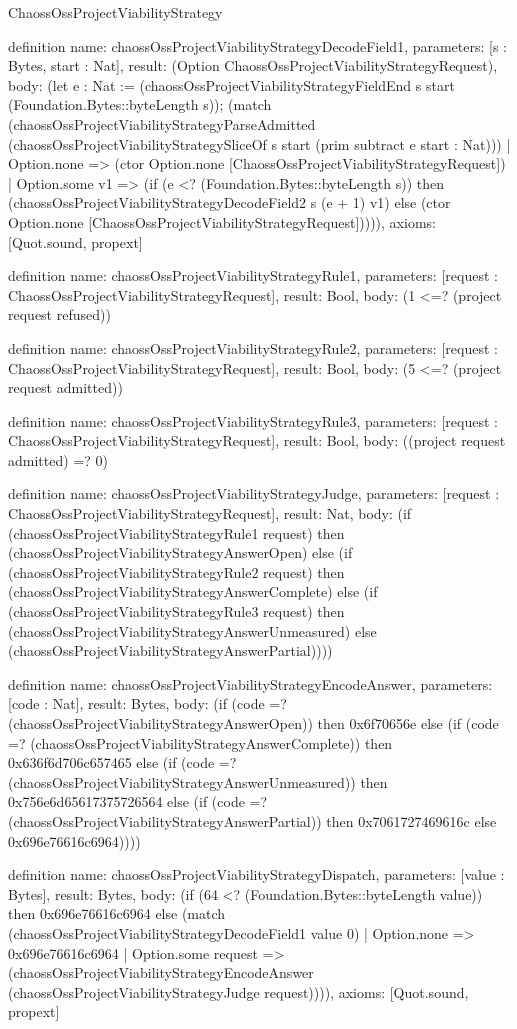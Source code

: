 \begin{lexlean}{ChaossOssProjectViabilityStrategy}
\begin{semanticmodule}
definition{
  name: chaossOssProjectViabilityStrategyDecodeField1,
  parameters: [s : Bytes, start : Nat],
  result: (Option ChaossOssProjectViabilityStrategyRequest),
  body: (let e : Nat := (chaossOssProjectViabilityStrategyFieldEnd s start (Foundation.Bytes::byteLength s)); (match (chaossOssProjectViabilityStrategyParseAdmitted (chaossOssProjectViabilityStrategySliceOf s start (prim subtract e start : Nat)))
    | Option.none => (ctor Option.none [ChaossOssProjectViabilityStrategyRequest])
    | Option.some v1 => (if (e <? (Foundation.Bytes::byteLength s)) then (chaossOssProjectViabilityStrategyDecodeField2 s (e + 1) v1) else (ctor Option.none [ChaossOssProjectViabilityStrategyRequest])))),
  axioms: [Quot.sound, propext]
}

definition{
  name: chaossOssProjectViabilityStrategyRule1,
  parameters: [request : ChaossOssProjectViabilityStrategyRequest],
  result: Bool,
  body: (1 <=? (project request refused))
}

definition{
  name: chaossOssProjectViabilityStrategyRule2,
  parameters: [request : ChaossOssProjectViabilityStrategyRequest],
  result: Bool,
  body: (5 <=? (project request admitted))
}

definition{
  name: chaossOssProjectViabilityStrategyRule3,
  parameters: [request : ChaossOssProjectViabilityStrategyRequest],
  result: Bool,
  body: ((project request admitted) =? 0)
}

definition{
  name: chaossOssProjectViabilityStrategyJudge,
  parameters: [request : ChaossOssProjectViabilityStrategyRequest],
  result: Nat,
  body: (if (chaossOssProjectViabilityStrategyRule1 request) then (chaossOssProjectViabilityStrategyAnswerOpen) else (if (chaossOssProjectViabilityStrategyRule2 request) then (chaossOssProjectViabilityStrategyAnswerComplete) else (if (chaossOssProjectViabilityStrategyRule3 request) then (chaossOssProjectViabilityStrategyAnswerUnmeasured) else (chaossOssProjectViabilityStrategyAnswerPartial))))
}

definition{
  name: chaossOssProjectViabilityStrategyEncodeAnswer,
  parameters: [code : Nat],
  result: Bytes,
  body: (if (code =? (chaossOssProjectViabilityStrategyAnswerOpen)) then 0x6f70656e else (if (code =? (chaossOssProjectViabilityStrategyAnswerComplete)) then 0x636f6d706c657465 else (if (code =? (chaossOssProjectViabilityStrategyAnswerUnmeasured)) then 0x756e6d65617375726564 else (if (code =? (chaossOssProjectViabilityStrategyAnswerPartial)) then 0x7061727469616c else 0x696e76616c6964))))
}

definition{
  name: chaossOssProjectViabilityStrategyDispatch,
  parameters: [value : Bytes],
  result: Bytes,
  body: (if (64 <? (Foundation.Bytes::byteLength value)) then 0x696e76616c6964 else (match (chaossOssProjectViabilityStrategyDecodeField1 value 0)
    | Option.none => 0x696e76616c6964
    | Option.some request => (chaossOssProjectViabilityStrategyEncodeAnswer (chaossOssProjectViabilityStrategyJudge request)))),
  axioms: [Quot.sound, propext]
}
\end{semanticmodule}
\end{lexlean}
